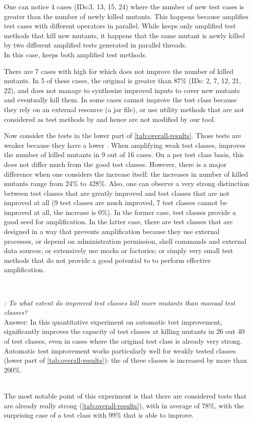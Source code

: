 One can notice 4 cases (IDs:3, 13, 15, 24) where the number of new test cases is greater than the number of newly killed mutants. 
This happens because \dspot amplifies test cases with different operators in parallel. 
While \dspot keeps only amplified test methods that kill new mutants, it happens that the same mutant is newly killed by two different amplified tests generated in parallel threads. \\
In this case, \dspot keeps both amplified test methods.

There are 7 cases with high \ms for which \dspot does not improve the number of killed mutants. 
In 5 of these cases, the original \ms is greater than 87\% (IDs: 2, 7, 12, 21, 22), and \dspot does not manage to synthesize improved inputs to cover new mutants and eventually kill them.
In some cases \dspot cannot improve the test class because they rely on an external resource (a jar file), or use utility methods that are not considered as test methods by \dspot and hence are not modified by our tool.

Now consider the tests in the lower part of \autoref{tab:overall-results}.
Those tests are weaker because they have a lower \ms. 
When amplifying weak test classes, \dspot improves the number of killed mutants in 9 out of 16 cases. 
On a per test class basis, this does not differ much from the good test classes. 
However, there is a major difference when one considers the increase itself: the increases in number of killed mutants range from 24\% to 428\%. 
Also, one can observe a very strong distinction between test classes that are greatly improved and test classes that are not improved at all (9 test classes are much improved, 7 test classes cannot be improved at all, the increase is 0\%). 
In the former case, test classes provide a good seed for amplification. 
In the latter case, there are test classes that are designed in a way that prevents amplification because they use external processes, or depend on administration permission, shell commands and external data sources; or extensively use mocks or factories; or simply very small test methods that do not provide a good potential to \dspot to perform effective amplification.

~\\
\begin{mdframed}
	\textit{\rqeffectiveness: To what extent do improved  test classes kill more mutants than manual test classes?}\\
	Answer: In this quantitative experiment on automatic test improvement, \dspot significantly improves the capacity of test classes at killing mutants in 26 out 40 of test classes, even in cases where the original test class is already very strong. 
	Automatic test improvement works particularly well for weakly tested classes (lower part of \autoref{tab:overall-results}): the \ms of three classes is increased by more than 200\%.
\end{mdframed}
~\\
The most notable point of this experiment is that there are considered tests that are already really strong (\autoref{tab:overall-results}), with \ms in average of 78\%, with the surprising case of a test class with 99\% \ms that \dspot is able to improve. 

